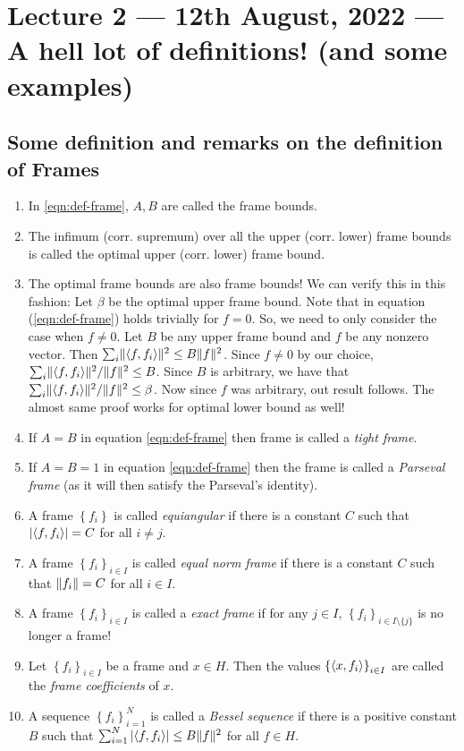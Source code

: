 \section{Lecture 2 --- 12th August, 2022 --- A hell lot of definitions! (and some examples)}

\subsection{Some definition and remarks on the definition of Frames}

\begin{enumerate}
    \item In \ref{eqn:def-frame}, $A,B$ are called the frame bounds.
    \item The infimum (corr. supremum) over all the upper (corr. lower) frame bounds is called the optimal upper (corr. lower) frame bound.
    \item The optimal frame bounds are also frame bounds! We can verify this in this fashion: Let $\beta$ be the optimal upper frame bound. Note that in equation (\ref{eqn:def-frame}) holds trivially for $f=0$. So, we need to only consider the case when $f\ne 0$. Let $B$ be any upper frame bound and $f$ be any nonzero vector. Then $\sum_{i} \lVert \langle f, f_i \rangle \rVert^2 \le B \lVert f \rVert^2$. Since $f\ne 0$ by our choice,  $\sum_{i} \lVert \langle f, f_i \rangle \rVert^2 / \lVert f \rVert^2 \le B$. Since $B$ is arbitrary, we have that $\sum_{i} \lVert \langle f, f_i \rangle \rVert^2 / \lVert f \rVert^2 \le \beta$. Now since $f$ was arbitrary, out result follows. The almost same proof works for optimal lower bound as well!
    \item If $A=B$ in equation \ref{eqn:def-frame} then frame is called a \textit{tight frame}.
    \item If $A=B=1$ in equation \ref{eqn:def-frame} then the frame is called a \textit{Parseval frame} (as it will then satisfy the Parseval's identity).
    \item A frame $\left\{ f_i \right\}$ is called \textit{equiangular} if there is a constant $C$ such that $|\langle f, f_i \rangle|=C$ for all $i\ne j$.
    \item A frame $\left\{ f_i \right\}_{i\in I}$ is called \textit{equal norm frame} if there is a constant $C$ such that $\lVert f_i \rVert=C$ for all $i\in I$.
    \item A frame $\left\{ f_i \right\} _{i\in I}$ is called a \textit{exact frame} if for any $j\in I$, $\left\{ f_i \right\} _{i \in I\setminus \{ j \}}$ is no longer a frame!
    \item Let $\left\{ f_i \right\}_{i\in I}$ be a frame and $x\in H$. Then the values $\left\{ \langle x, f_i \rangle \right\}_{i\in I}$ are called the \textit{frame coefficients} of $x$.
    \item A sequence $\left\{ f_i \right\}_{i=1}^{N}$ is called a \textit{Bessel sequence} if there is a positive constant $ B$ such that $\sum_{i=1}^{N} |\langle f, f_i \rangle| \le B \lVert f \rVert ^2$ for all $f\in H$. 

\end{enumerate}

